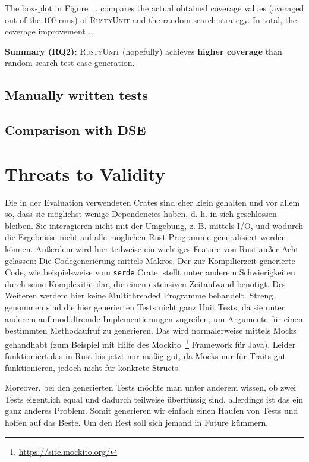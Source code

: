 \documentclass[paper=a4,%
  twoside,%
  BCOR4mm,%
  abstract=true,%
  toc=bibliography,%
  chapterprefix=true,%
  toc=bibliographynumbered,%
  open=right,%
  english,%
  pagesize=pdftex]{scrreprt}
\begin{document}
The box-plot in Figure ... compares the actual obtained coverage values (averaged out of the $100$ runs) of \textsc{RustyUnit} and the random search strategy. In total, the coverage improvement ...

\begin{tcolorbox}
\textbf{Summary (RQ2):} \textsc{RustyUnit} (hopefully) achieves \textbf{higher coverage} than random search test case generation. 
\end{tcolorbox}

\subsection{Manually written tests}

\subsection{Comparison with DSE}

\section{Threats to Validity}
\label{sec:threats-to-validity}
Die in der Evaluation verwendeten Crates sind eher klein gehalten und vor allem so, dass sie möglichst wenige Dependencies haben, d. h. in sich geschlossen bleiben. Sie interagieren nicht mit der Umgebung, z. B. mittels I/O, und wodurch die Ergebnisse nicht auf alle möglichen Rust Programme generalisiert werden können. Außerdem wird hier teilweise ein wichtiges Feature von Rust außer Acht gelassen: Die Codegenerierung mittels Makros. Der zur Kompilierzeit generierte Code, wie beispielsweise vom \lstinline{serde} Crate, stellt unter anderem Schwierigkeiten durch seine Komplexität dar, die einen extensiven Zeitaufwand benötigt. Des Weiteren werdem hier keine Multithreaded Programme behandelt. Streng genommen sind die hier generierten Tests nicht ganz Unit Tests, da sie unter anderem auf modulfremde Implementierungen zugreifen, um Argumente für einen bestimmten Methodaufruf zu generieren. Das wird normalerweise mittels Mocks gehandhabt (zum Beispiel mit Hilfe des Mockito~\footnote{\url{https://site.mockito.org/}} Framework für Java). Leider funktioniert das in Rust bis jetzt nur mäßig gut, da Mocks nur für Traits gut funktionieren, jedoch nicht für konkrete Structs. 

Moreover, bei den generierten Tests möchte man unter anderem wissen, ob zwei Tests eigentlich equal und dadurch teilweise überflüssig sind, allerdings ist das ein ganz anderes Problem. Somit generieren wir einfach einen Haufen von Tests und hoffen auf das Beste. Um den Rest soll sich jemand in Future kümmern.
\end{document}
